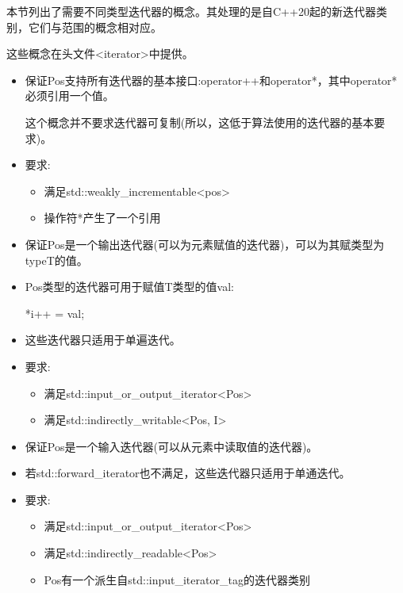 
本节列出了需要不同类型迭代器的概念。其处理的是自C++20起的新迭代器类别，它们与范围的概念相对应。

这些概念在头文件<iterator>中提供。


\begin{itemize}
\item
保证Pos支持所有迭代器的基本接口:operator++和operator*，其中operator*必须引用一个值。

这个概念并不要求迭代器可复制(所以，这低于算法使用的迭代器的基本要求)。

\item
要求:
\begin{itemize}
\item
满足std::weakly\_incrementable<pos>

\item
操作符*产生了一个引用
\end{itemize}
\end{itemize}


\begin{itemize}
\item
保证Pos是一个输出迭代器(可以为元素赋值的迭代器)，可以为其赋类型为typeT的值。

\item
Pos类型的迭代器可用于赋值T类型的值val:

\begin{cpp}
*i++ = val;
\end{cpp}

\item
这些迭代器只适用于单遍迭代。

\item
要求:
\begin{itemize}
\item
满足std::input\_or\_output\_iterator<Pos>

\item
满足std::indirectly\_writable<Pos, I>
\end{itemize}
\end{itemize}


\begin{itemize}
\item
保证Pos是一个输入迭代器(可以从元素中读取值的迭代器)。

\item
若std::forward\_iterator也不满足，这些迭代器只适用于单通迭代。

\item
要求:
\begin{itemize}
\item
满足std::input\_or\_output\_iterator<Pos>

\item
满足std::indirectly\_readable<Pos>

\item
Pos有一个派生自std::input\_iterator\_tag的迭代器类别
\end{itemize}
\end{itemize}

